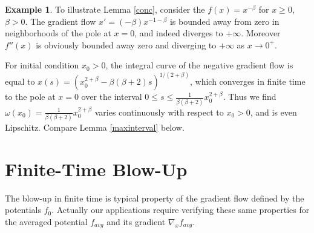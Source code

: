 \documentclass[12pt]{amsart}
\theoremstyle{definition}
\newtheorem*{exx}{Example}
\theoremstyle{remark}
\begin{document}
\begin{exx} 
To illustrate Lemma \ref{conc}, consider the $f(x)=x^{-\beta}$ for $x\geq 0$, $\beta>0$. The gradient flow $x'= (-\beta)x^{-1-\beta}$ is bounded away from zero in neighborhoods of the pole at $x=0$, and indeed diverges to $+\infty$. Moreover $f''(x)$ is obviously bounded away zero and diverging to $+\infty$ as $x\to 0^+$. 

For initial condition $x_0>0$, the integral curve of the negative gradient flow is equal to $x(s)=(x_0^{2+\beta} - \beta(\beta+2)s)^{1/(2+\beta)}$, which converges in finite time to the pole at $x=0$ over the interval $0\leq s\leq \frac{1}{\beta(\beta+2)}x_0^{2+\beta}$. Thus we find $\omega(x_0)=\frac{1}{\beta(\beta+2)}x_0^{2+\beta}$ varies continuously with respect to $x_0>0$, and is even Lipschitz. Compare Lemma \ref{maxinterval} below. 

\end{exx}

\section{Finite-Time Blow-Up}


The blow-up in finite time is typical property of the gradient flow defined by the potentials $f_0$. Actually our applications require verifying these same properties for the averaged potential $f_{avg}$ and its gradient $\nabla_x f_{avg}$. 
\end{document}
